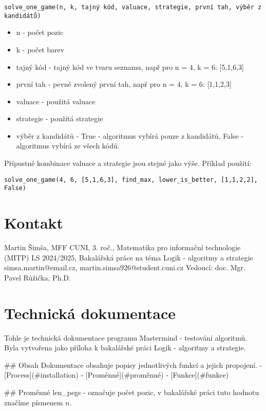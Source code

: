 \documentclass[12pt,a4paper]{article}
\begin{document}
\texttt{solve\_one\_game(n, k, tajný kód, valuace, strategie, první tah, výběr z kandidátů)}
\begin{itemize}
    \item n - počet pozic
    \item k - počet barev
    \item tajný kód - tajný kód ve tvaru seznamu, např pro n = 4, k = 6: [5,1,6,3]
    \item první tah - pevně zvolený první tah, např pro n = 4, k = 6: [1,1,2,3]
    \item valuace - použitá valuace
    \item strategie - použitá strategie
    \item výběr z kandidátů - True - algoritmus vybírá pouze z kandidátů, 
        False - algoritmus vybírá ze všech kódů.
\end{itemize}

Přípustné kombinace valuace a strategie jsou stejné jako výše.
Příklad použití:

\texttt{solve\_one\_game(4, 6, [5,1,6,3], find\_max, lower\_is\_better, [1,1,2,2], False)}



\section{Kontakt}
Martin Šimša, MFF CUNI, 3. roč., Matematika pro informační technologie (MITP)
LS 2024/2025, Bakalářská práce na téma Logik - algoritmy a strategie
simsa.martin@email.cz, martin.simsa926@student.cuni.cz
Vedoucí: doc. Mgr. Pavel Růžička, Ph.D.







\section{Technická dokumentace}
Tohle je technická dokumentace programu Mastermind - testování algoritmů. Byla vytvořena jako příloha k bakalářské práci Logik - algoritmy a strategie. 

## Obsah
Dokumentace obsahuje popisy jednotlivých funkcí a jejich propojení. 
- [Process](#installation)
- [Proměnné](#proměnné)
- [Funkce](#funkce)

## Proměnné
len_pegs - označuje počet pozic, v bakalářské práci tuto hodnotu značíme písmenem $n$.
\end{document}
